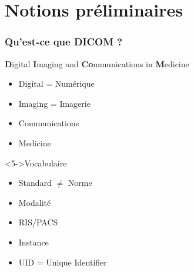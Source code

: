 \section{Notions pr\'eliminaires}

	\frame
	{
		\frametitle{Qu'est-ce que DICOM ?}
		
		\begin{block}{\textbf{D}igital \textbf{I}maging and \textbf{Co}mmunications in \textbf{M}edicine}
			\begin{itemize}
				\item<2-> Digital = Num\'erique
		    		\item<3-> Imaging = Imagerie
		    		\item<4-> Communications
		    		\item<4-> Medicine
			\end{itemize}
		\end{block}
		
		\begin{block}<5->{Vocabulaire}
		\begin{itemize}
			\item<6-> Standard $\neq$ Norme
			\item<7-> Modalit\'e
			\item<8-> RIS/PACS
			\item<9-> Instance
			\item<10-> UID = Unique Identifier
		\end{itemize}
		\end{block}
	}
	
